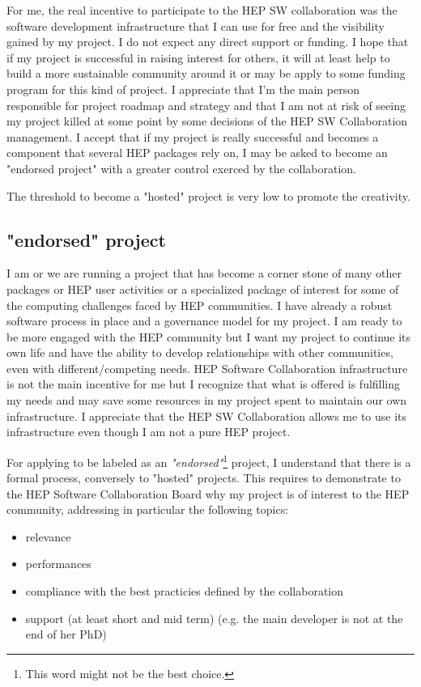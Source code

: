 \documentclass[11pt]{article} %
\begin{document}
For me, the real incentive to participate to the HEP SW collaboration was the software development infrastructure
that I can use for free and the visibility gained by my project. I do not expect any direct support or funding. I hope that
if my project is successful in raising interest for others, it will at least help to build a more sustainable community around
it or may be apply to some funding program for this kind of project. I appreciate that I'm the main person responsible for project
roadmap and strategy and that I am not at risk of seeing my project killed at some point by some decisions of the HEP SW Collaboration
management. I accept that if my project is really successful and becomes a component that several HEP packages rely on, I may be
asked to become an "endorsed project" with a greater control exerced by the collaboration.

The threshold to become a "hosted" project is very low to promote the creativity. 


\subsection{"endorsed" project }

I am or we are running a project that has become a corner stone of many other packages or HEP user activities or a specialized package of
interest for some of the computing challenges faced by HEP communities. I have already a robust software process in place and a governance model
for my project. I am ready to be more engaged with the HEP community but I want my project to continue its own life and have the ability to
develop relationships with other communities, even with different/competing needs. HEP Software Collaboration infrastructure is not the main incentive
for me but I recognize that what is offered is fulfilling my needs and may save some resources in my project spent to maintain our own infrastructure.
I appreciate that the HEP SW Collaboration allows me to use its infrastructure even though I am not a pure HEP project.

For applying to be labeled as an {\em "endorsed"}\footnote{This word might not be the best choice.} project, I understand that there is a formal
process, conversely to "hosted" projects. This requires to demonstrate to the HEP Software Collaboration Board why my project is of interest to the
HEP community, addressing in particular the following topics:
\begin{itemize}
\item relevance
\item performances 
\item compliance with the best practicies defined by the collaboration 
\item support (at least short and mid term) (e.g. the main developer is not at the end of her PhD) 
\end{itemize}
\end{document}
